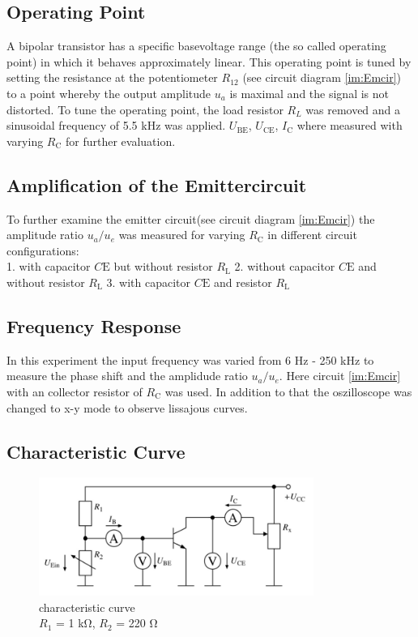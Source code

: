 \documentclass[11pt, a4paper]{article}
\begin{document}
\FloatBarrier
\subsection{Operating Point}
A bipolar transistor has a specific basevoltage range (the so called operating point) in which it behaves approximately linear. This operating point
is tuned by setting the resistance at the potentiometer $R_{12}$ (see circuit diagram \ref{im:Emcir}) to a point whereby the output amplitude $u_a$ is maximal and the signal is not distorted.
To tune the operating point, the load resistor $R_L$ was removed and a sinusoidal frequency of 5.5 \si{\kilo\hertz} was applied. 
$U_{\text{BE}}$, $U_{\text{CE}}$, $I_{\text{C}}$ where measured with varying $R_{\text{C}}$ for further evaluation.
\FloatBarrier
\subsection{Amplification of the Emittercircuit}
To further examine the emitter circuit(see circuit diagram  \ref{im:Emcir}) the amplitude ratio $u_a / u_e$ was measured for varying $R_{\text{C}}$ in different circuit configurations:\\
1. with capacitor $C{\text{E}}$ but without resistor $R_{\text{L}}$
2. without capacitor $C{\text{E}}$ and without resistor $R_{\text{L}}$
3. with capacitor $C{\text{E}}$ and resistor $R_{\text{L}}$
\FloatBarrier
\subsection{Frequency Response}
In this experiment the input frequency was varied from 6 \si{\hertz} - 250 \si{\kilo\hertz} to measure the phase shift and the amplidude ratio $u_a / u_e$. 
Here circuit \ref{im:Emcir} with an collector resistor of $R_{\text{C}}$ was used. In addition to that the oszilloscope was changed to x-y mode to observe lissajous curves.
\FloatBarrier
\subsection{Characteristic Curve}
\begin{figure}[h]
    \centering
    \includegraphics[width=0.8\textwidth]{bilder/characteristicCurve.png}
    \caption{characteristic curve \\
    $R_1$ = 1 \si{\kilo\ohm}, $R_2$ = 220 \si{\ohm}}
    \label{im:Charcurcir}
\end{figure}
\end{document}
